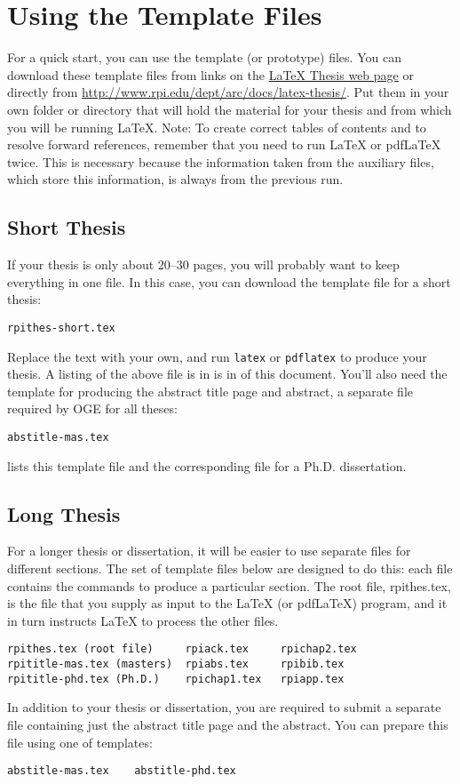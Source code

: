\documentclass[letterpaper,11pt]{article}
\begin{document}
\section{Using the Template Files}

For a quick start, you can use the template (or prototype) files. You
can download these template files from links on the
\href{http://www.rpi.edu/dept/arc/docs/latex-thesis/}{{\LaTeX} Thesis web page}
or directly from
\url{http://www.rpi.edu/dept/arc/docs/latex-thesis/}. Put them in your own
folder or directory that will hold the material for your thesis and
from which you will be running {\LaTeX}.  Note: To create correct
tables of contents and to resolve forward references, remember that
you need to run {\LaTeX} or pdf{\LaTeX} twice. This is necessary
because the information taken from the auxiliary files, which store
this information, is always from the previous run.

\subsection{Short Thesis}

If your thesis is only about 20--30 pages, you will probably want to keep everything in one file.
In this case, you can download the template file for a short thesis:
\begin{verbatim}
rpithes-short.tex
\end{verbatim}
Replace the text with your own, and run \verb|latex| or \verb|pdflatex| to produce your thesis. A listing
of the above file is in is in  of this document. You'll also need the template for
producing the abstract title page and abstract, a separate file required by OGE for all theses:
\begin{verbatim}
abstitle-mas.tex
\end{verbatim}
 lists this template file and the corresponding file for a Ph.D. dissertation.

\subsection{Long Thesis}

For a longer thesis or dissertation, it will be easier to use separate files for different sections.
The set of template files below are designed to do this: each file contains the commands to
produce a particular section. The root file, rpithes.tex, is the file that you supply as input
to the {\LaTeX} (or pdf{\LaTeX}) program, and it in turn instructs {\LaTeX} to process the other files.
\begin{verbatim}
rpithes.tex (root file)     rpiack.tex     rpichap2.tex
rpititle-mas.tex (masters)  rpiabs.tex     rpibib.tex
rpititle-phd.tex (Ph.D.)    rpichap1.tex   rpiapp.tex
\end{verbatim}
In addition to your thesis or dissertation, you are required to submit a separate file containing
just the abstract title page and the abstract. You can prepare this file using one of templates:
\begin{verbatim}
abstitle-mas.tex    abstitle-phd.tex
\end{verbatim}
\end{document}
